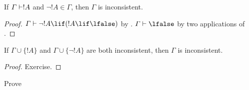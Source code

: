 \documentclass[../../../include/open-logic-section]{subfiles}
\begin{document}
\begin{prop}
  If $\Gamma \Proves !A$ and $\lnot !A \in \Gamma$, then $\Gamma$ is
  inconsistent.
\end{prop}

\begin{proof}
  $\Gamma \Proves \lnot !A \lif (!A \lif \lfalse)$ by .
  $\Gamma \Proves \lfalse$ by two applications of .
\end{proof}


\begin{prop}
  If $\Gamma \cup \{!A\}$ and $\Gamma \cup \{\lnot !A\}$ are both
  inconsistent, then $\Gamma$ is inconsistent.
\end{prop}

\begin{proof}
Exercise.
\end{proof}

\begin{prob}
  Prove 
\end{prob}
    
\end{document}
